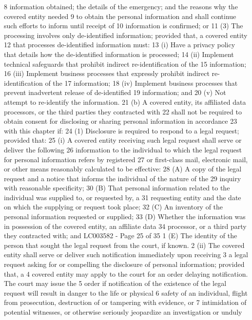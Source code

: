 8 information obtained; the details of the emergency; and the reasons why the covered entity needed
9 to obtain the personal information and shall continue such efforts to inform until receipt of
10 information is confirmed; or
11 (3) The processing involves only de-identified information; provided that, a covered entity
12 that processes de-identified information must:
13 (i) Have a privacy policy that details how the de-identified information is processed;
14 (ii) Implement technical safeguards that prohibit indirect re-identification of the
15 information;
16 (iii) Implement business processes that expressly prohibit indirect re-identification of the
17 information;
18 (iv) Implement business processes that prevent inadvertent release of de-identified
19 information; and
20 (v) Not attempt to re-identify the information.
21 (b) A covered entity, its affiliated data processors, or the third parties they contracted with
22 shall not be required to obtain consent for disclosing or sharing personal information in accordance
23 with this chapter if:
24 (1) Disclosure is required to respond to a legal request; provided that:
25 (i) A covered entity receiving such legal request shall serve or deliver the following
26 information to the individual to which the legal request for personal information refers by registered
27 or first-class mail, electronic mail, or other means reasonably calculated to be effective:
28 (A) A copy of the legal request and a notice that informs the individual of the nature of the
29 inquiry with reasonable specificity;
30 (B) That personal information related to the individual was supplied to, or requested by, a
31 requesting entity and the date on which the supplying or request took place;
32 (C) An inventory of the personal information requested or supplied;
33 (D) Whether the information was in possession of the covered entity, an affiliate data
34 processor, or a third party they contracted with; and
LC003582 - Page 25 of 35
1 (E) The identity of the person that sought the legal request from the court, if known.
2 (ii) The covered entity shall serve or deliver such notification immediately upon receiving
3 a legal request asking for or compelling the disclosure of personal information; provided that, a
4 covered entity may apply to the court for an order delaying notification. The court may issue the
5 order if notification of the existence of the legal request will result in danger to the life or physical
6 safety of an individual, flight from prosecution, destruction of or tampering with evidence, or
7 intimidation of potential witnesses, or otherwise seriously jeopardize an investigation or unduly
